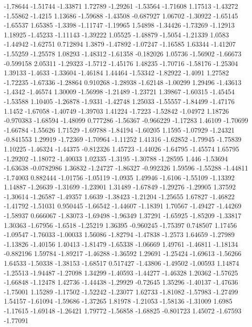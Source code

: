 \documentclass[9pt]{article}
\theoremstyle{plain}
\theoremstyle{definition}
\theoremstyle{remark}
\numberwithin{equation}{section}
\begin{document}
-1.78644
-1.51744
-1.33871
1.72789
-1.29261
-1.53564
-1.71608
1.17513
-1.43272
-1.55862
-1.4215
1.13686
-1.59688
-1.43508
-0.687927
1.06702
-1.30922
-1.65145
-1.65537
1.65385
-1.3398
-1.11747
-1.19965
1.54898
-1.34426
-1.73269
-1.12913
1.18925
-1.45233
-1.11143
-1.39222
1.05525
-1.48879
-1.5054
-1.21339
1.0583
-1.44942
-1.62751
0.712894
1.3879
-1.47892
-1.07247
-1.16585
1.63344
-1.41207
-1.55259
-1.25578
1.08293
-1.48312
-1.61358
-0.182026
1.05736
-1.56902
-1.66673
-0.599158
2.05311
-1.29323
-1.5712
-1.45176
1.48235
-1.70716
-1.58176
-1.25304
1.39133
-1.4633
-1.33604
-1.46184
1.44464
-1.53342
-1.82922
-1.4091
1.27582
-1.72235
-1.67336
-1.28864
0.910268
-1.28938
-1.62148
-1.00299
1.29496
-1.43613
-1.4342
-1.46574
1.30009
-1.56998
-1.21489
-1.23721
1.39867
-1.60315
-1.45454
-1.53588
1.10405
-1.26878
-1.9331
-1.42748
1.25033
-1.55557
-1.84499
-1.47176
1.1452
-1.67058
-1.40749
-1.39703
1.41224
-1.7223
-1.52842
-1.04972
1.18726
-0.970383
-1.68594
-1.48099
0.777286
-1.56367
-0.966229
-1.17283
1.46109
-1.70699
-1.66784
-1.55626
1.71529
-1.69788
-1.84194
-1.60205
1.1595
-1.07929
-1.24321
-0.841553
1.29919
-1.72369
-1.70964
-1.11252
1.41316
-1.62852
-1.79945
-1.75839
1.10225
-1.46324
-1.44375
-0.812326
1.45723
-1.44026
-1.64795
-1.45574
1.65795
-1.29202
-1.18072
-1.40033
1.02335
-1.3195
-1.30788
-1.28595
1.446
-1.53694
-1.63638
-0.0782986
1.36832
-1.24727
-1.86327
-0.992326
1.59596
-1.55288
-1.44811
-1.74003
0.882444
-1.01756
-1.05119
-1.0935
1.49946
-1.6106
-1.55109
-1.13392
1.14887
-1.26639
-1.31699
-1.23901
1.31489
-1.67849
-1.29276
-1.29905
1.37592
-1.30614
-1.26587
-1.49357
1.6639
-1.38423
-1.21204
-1.25655
1.67827
-1.46822
-1.41792
-1.51031
0.950445
-1.66542
-1.44607
-1.18391
1.70567
-1.49427
-1.44269
-1.58937
0.666067
-1.83073
-1.69498
-1.96349
1.37291
-1.65925
-1.85209
-1.33817
1.30363
-1.67956
-1.6518
-1.25219
1.36395
-0.960245
-1.75397
0.748507
1.17456
-1.09547
-1.76033
-1.00033
1.56086
-1.82794
-1.47838
-1.2573
1.64659
-1.27989
-1.13826
-1.40156
1.40413
-1.81479
-1.65338
-1.06669
1.49761
-1.46811
-1.18134
-0.882196
1.59784
-1.89217
-1.46288
-1.36592
1.29691
-1.25424
-1.69613
-1.56266
1.64533
-1.50338
-1.38153
-1.68517
0.517427
-1.43806
-1.49502
-1.00593
1.14874
-1.25513
-1.94487
-1.27098
1.34299
-1.40593
-1.44277
-1.46328
1.20362
-1.57625
-1.66848
-1.12478
1.42736
-1.44438
-1.29929
-0.72645
1.35296
-1.40137
-1.47636
-1.75001
1.15289
-1.17502
-1.52242
-1.23077
1.62733
-1.81082
-1.57983
-1.27499
1.54157
-1.61094
-1.59686
-1.37265
1.81978
-1.21053
-1.58136
-1.31009
1.6985
-1.17615
-1.69148
-1.26421
1.79772
-1.56858
-1.68825
-0.801723
1.45072
-1.67593
-1.77091
\end{document}
